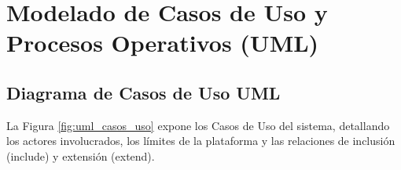 \section{Modelado de Casos de Uso y Procesos Operativos (UML)}
\label{sec:casos_uso_actividades}

\subsection{Diagrama de Casos de Uso UML}

La Figura \ref{fig:uml_casos_uso} expone los Casos de Uso del sistema, detallando los actores involucrados, los límites de la plataforma y las relaciones de inclusión (\guillemotleft include\guillemotright) y extensión (\guillemotleft extend\guillemotright).


